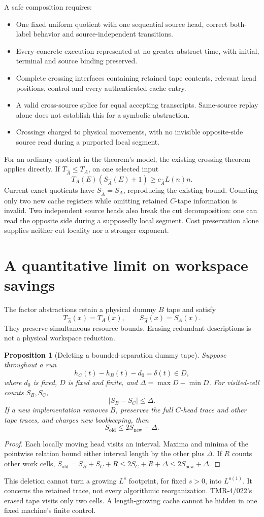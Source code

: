 \documentclass[11pt]{article}
\newtheorem{proposition}[theorem]{Proposition}
\begin{document}
A safe composition requires:
\begin{itemize}
\item[] One fixed uniform quotient with one sequential source head, correct both-label behavior and source-independent transitions.
\item[] Every concrete execution represented at no greater abstract time, with initial, terminal and source binding preserved.
\item[] Complete crossing interfaces containing retained tape contents, relevant head positions, control and every authenticated cache entry.
\item[] A valid cross-source splice for equal accepting transcripts. Same-source replay alone does not establish this for a symbolic abstraction.
\item[] Crossings charged to physical movements, with no invisible opposite-side source read during a purported local segment.
\end{itemize}
For an ordinary quotient in the theorem's model, the existing crossing theorem applies directly. If \(T_{\widehat A}\le T_A\), on one selected input
\[
T_A(E)(S_{\widehat A}(E)+1)\ge c_{\widehat A}L(n)n.
\]
Current exact quotients have \(S_{\widehat A}=S_A\), reproducing the existing bound. Counting only two new cache registers while omitting retained \(C\)-tape information is invalid. Two independent source heads also break the cut decomposition: one can read the opposite side during a supposedly local segment. Cost preservation alone supplies neither cut locality nor a stronger exponent.

\section{A quantitative limit on workspace savings}
The factor abstractions retain a physical dummy \(B\) tape and satisfy
\[
T_{\widehat A}(x)=T_A(x),\qquad S_{\widehat A}(x)=S_A(x).
\]
They preserve simultaneous resource bounds. Erasing redundant descriptions is not a physical workspace reduction.

\begin{proposition}[Deleting a bounded-separation dummy tape]
Suppose throughout a run
\[
h_C(t)-h_B(t)-d_0=\delta(t)\in D,
\]
where \(d_0\) is fixed, \(D\) is fixed and finite, and
\(\Delta=\max D-\min D\). For visited-cell counts \(S_B,S_C\),
\[
|S_B-S_C|\le\Delta.
\]
If a new implementation removes \(B\), preserves the full \(C\)-head trace and other tape traces, and charges new bookkeeping, then
\[
S_{\mathrm{old}}\le2S_{\mathrm{new}}+\Delta.
\]
\end{proposition}
\begin{proof}
Each locally moving head visits an interval. Maxima and minima of the pointwise relation bound either interval length by the other plus \(\Delta\). If \(R\) counts other work cells,
\(S_{\mathrm{old}}=S_B+S_C+R\le2S_C+R+\Delta\le2S_{\mathrm{new}}+\Delta\).
\end{proof}
This deletion cannot turn a growing \(L^s\) footprint, for fixed \(s>0\), into \(L^{o(1)}\). It concerns the retained trace, not every algorithmic reorganization. TMR-4/022's erased tape visits only two cells. A length-growing cache cannot be hidden in one fixed machine's finite control.
\end{document}
